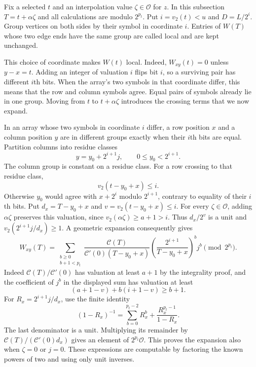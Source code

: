 Fix a selected $t$ and an interpolation value $\zeta\in\mathcal O$
for $z$.  In this subsection $T=t+\alpha\zeta$ and all calculations
are modulo $2^{p_t}$.  Put $i=v_2(t)<u$ and $D=L/2^i$.
Group vertices on both sides by their symbol in coordinate $i$.
Entries of $W(T)$ whose two edge ends have the same group are called
local and are kept unchanged.

This choice of coordinate makes $W(t)$ local.  Indeed,
$W_{xy}(t)=0$ unless $y-x=t$.  Adding an integer of valuation $i$
flips bit $i$, so a surviving pair has different $i$th bits.
When the array's two symbols in that coordinate differ, this
means that the row and column symbols agree. Equal pairs of symbols
already lie in one group.  Moving from $t$ to $t+\alpha\zeta$ introduces
the crossing terms that we now expand.

In an array whose two symbols in coordinate $i$ differ, a row
position $x$ and a column position $y$ are in different groups
exactly when their $i$th bits are equal.  Partition columns into
residue classes
\[
 y=y_0+2^{i+1}j,\qquad 0\le y_0<2^{i+1}.
\]
The column group is constant on a residue class.  For a row crossing to
that residue class,
\[
 v_2(t-y_0+x)\le i.
\]
Otherwise $y_0$ would agree with $x+2^i$ modulo $2^{i+1}$,
contrary to equality of their $i$th bits. Put
$d_x=T-y_0+x$ and $v=v_2(t-y_0+x)\le i$.
For every $\zeta\in\mathcal O$, adding $\alpha\zeta$ preserves this
valuation, since $v_2(\alpha\zeta)\ge a+1>i$.
Thus $d_x/2^v$ is a unit and
$v_2(2^{i+1}j/d_x)\ge1$.
A geometric expansion consequently
gives
\begin{equation}\label{eq:tensor-linear-form-expansion}
 W_{xy}(T)=
 \sum_{\substack{b\ge0\\b+1<p_t}}
 \frac{\mathcal C(T)}
      {\mathcal C'(0)(T-y_0+x)}
 \left(\frac{2^{i+1}}{T-y_0+x}\right)^b j^b
 \pmod {2^{p_t}}.
\end{equation}
Indeed $\mathcal C(T)/\mathcal C'(0)$ has valuation at least
$a+1$ by the integrality proof, and the coefficient of $j^b$
in the displayed sum has valuation at least
\[
 (a+1-v)+b(i+1-v)\ge b+1.
\]
For $R_x=2^{i+1}j/d_x$, use the finite identity
\[
 (1-R_x)^{-1}=\sum_{b=0}^{p_t-2}R_x^b+
                  \frac{R_x^{p_t-1}}{1-R_x}.
\]
The last denominator is a unit. Multiplying its remainder by
$\mathcal C(T)/(\mathcal C'(0)d_x)$ gives an element of
$2^{p_t}\mathcal O$. This proves the expansion also when
$\zeta=0$ or $j=0$. These expressions are computable by
factoring the known powers of two and using only unit inverses.

